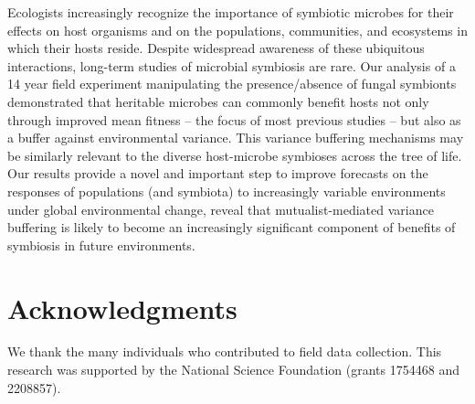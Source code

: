 \documentclass[12pt]{article}
\begin{document}
Ecologists increasingly recognize the importance of symbiotic microbes for their effects on host organisms and on the populations, communities, and ecosystems in which their hosts reside.
Despite widespread awareness of these ubiquitous interactions, long-term studies of microbial symbiosis are rare. 
Our analysis of a 14 year field experiment manipulating the presence/absence of fungal symbionts demonstrated that heritable microbes can commonly benefit hosts not only through improved mean fitness -- the focus of most previous studies -- but also as a buffer against environmental variance. 
This variance buffering mechanisms may be similarly relevant to the diverse host-microbe symbioses across the tree of life.
Our results provide a novel and important step to improve forecasts on the responses of populations (and symbiota) to increasingly variable environments under global environmental change, reveal that mutualist-mediated variance buffering is likely to become an increasingly significant component of benefits of symbiosis in future environments.














\section*{Acknowledgments}
We thank the many individuals who contributed to field data collection. This research was supported by the National Science Foundation (grants 1754468 and 2208857). 
\end{document}
